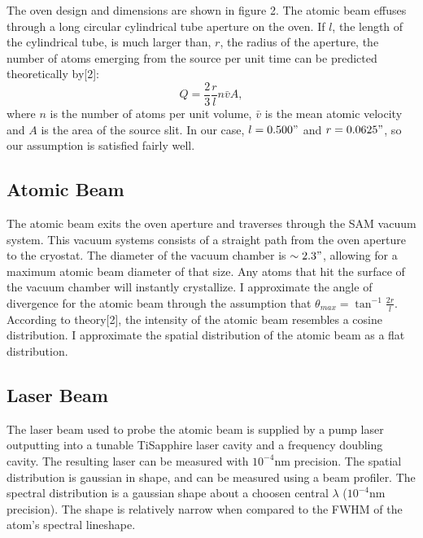 \documentclass[12pt, a4paper]{article}
\begin{document}
The oven design and dimensions are shown in figure 2. The atomic beam effuses through a long circular cylindrical tube aperture on the oven. If $l$, the length of the cylindrical tube, is much larger than, $r$, the radius of the aperture, the number of atoms emerging from the source per unit time can be predicted theoretically by[2]:
\begin{equation}
Q = \frac{2}{3}\frac{r}{l}n\bar{v}A,
\end{equation}
where $n$ is the number of atoms per unit volume, $\bar{v}$ is the mean atomic velocity and $A$ is the area of the source slit. In our case, $l = 0.500"$ and $r = 0.0625"$, so our assumption is satisfied fairly well.

\subsection{Atomic Beam}
The atomic beam exits the oven aperture and traverses through the SAM vacuum system. This vacuum systems consists of a straight path from the oven aperture to the cryostat. The diameter of the vacuum chamber is $\sim 2.3"$, allowing for a maximum atomic beam diameter of that size. Any atoms that hit the surface of the vacuum chamber will instantly crystallize. I approximate the angle of divergence for the atomic beam through the assumption that $\theta_{max} = \tan^{-1}\frac{2r}{l}$. According to theory[2], the intensity of the atomic beam resembles a cosine distribution. I approximate the spatial distribution of the atomic beam as a flat distribution.
\subsection{Laser Beam}
The laser beam used to probe the atomic beam is supplied by a pump laser outputting into a tunable TiSapphire laser cavity and a frequency doubling cavity. The resulting laser can be measured with $10^{-4}$nm precision. The spatial distribution is gaussian in shape, and can be measured using a beam profiler. The spectral distribution is a gaussian shape about a choosen central $\lambda$ ($10^{-4}$nm precision). The shape is relatively narrow when compared to the FWHM of the atom's spectral lineshape. 
\end{document}
